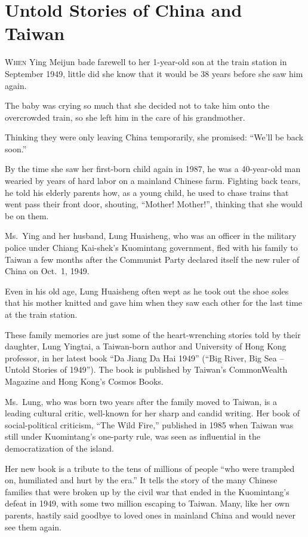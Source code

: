 ﻿\documentclass[12pt]{article}
\begin{document}
\section{Untold Stories of China and Taiwan}

\lettrine{W}{hen} Ying Meijun bade farewell to her 1-year-old son at the
train station in September 1949, little did she know that it would be 38 years before she saw him
again.

The baby was crying so much that she decided not to take him onto the overcrowded train, so she left
him in the care of his grandmother.

Thinking they were only leaving China temporarily, she promised: ``We'll be back soon.''

By the time she saw her first-born child again in 1987, he was a 40-year-old man wearied by years of
hard labor on a mainland Chinese farm. Fighting back tears, he told his elderly parents how, as a
young child, he used to chase trains that went pass their front door, shouting, ``Mother! Mother!'',
thinking that she would be on them.

Ms.~Ying and her husband, Lung Huaisheng, who was an officer in the military police under Chiang
Kai-shek's Kuomintang government, fled with his family to Taiwan a few months after the Communist
Party declared itself the new ruler of China on Oct.~1, 1949.

Even in his old age, Lung Huaisheng often wept as he took out the shoe soles that his mother knitted
and gave him when they saw each other for the last time at the train station.

These family memories are just some of the heart-wrenching stories told by their daughter, Lung
Yingtai, a Taiwan-born author and University of Hong Kong professor, in her latest book ``Da Jiang
Da Hai 1949'' (``Big River, Big Sea -- Untold Stories of 1949''). The book is published by Taiwan's
CommonWealth Magazine and Hong Kong's Cosmos Books.

Ms.~Lung, who was born two years after the family moved to Taiwan, is a leading cultural critic,
well-known for her sharp and candid writing. Her book of social-political criticism, ``The Wild
Fire,'' published in 1985 when Taiwan was still under Kuomintang's one-party rule, was seen as
influential in the democratization of the island.

Her new book is a tribute to the tens of millions of people ``who were trampled on, humiliated and
hurt by the era.'' It tells the story of the many Chinese families that were broken up by the civil
war that ended in the Kuomintang's defeat in 1949, with some two million escaping to Taiwan. Many,
like her own parents, hastily said goodbye to loved ones in mainland China and would never see them
again.
\end{document}
